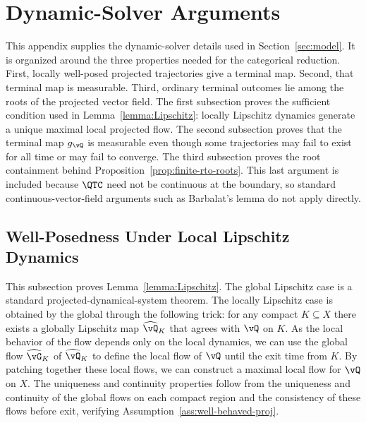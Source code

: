 \section{Dynamic-Solver Arguments}

This appendix supplies the dynamic-solver details used in
Section~\ref{sec:model}. It is organized around the three properties needed for
the categorical reduction. First, locally well-posed projected trajectories give
a terminal map. Second, that terminal map is measurable. Third, ordinary
terminal outcomes lie among the roots of the projected vector field.
The first subsection proves the sufficient condition used in
Lemma~\ref{lemma:Lipschitz}: locally Lipschitz dynamics generate a unique
maximal local projected flow. The second subsection proves that the terminal
map $g_{\vQ}$ is measurable even though some trajectories may fail to exist for
all time or may fail to converge. The third subsection proves the root
containment behind Proposition~\ref{prop:finite-rto-roots}. This last argument
is included because $\QTC$ need not be continuous at the boundary, so standard
continuous-vector-field arguments such as Barbalat's lemma do not apply
directly.

\subsection{Well-Posedness Under Local Lipschitz Dynamics}\label{proof:lipschitz-local-flow}

This subsection proves Lemma~\ref{lemma:Lipschitz}. The global Lipschitz case
is a standard projected-dynamical-system theorem. The locally Lipschitz case
is obtained by the global through the following trick: for any compact
$K\subseteq X$ there exists a globally Lipschitz map $\widehat{\vQ}_K$ that
agrees with $\vQ$ on $K$. As the local behavior of the flow depends only on the
local dynamics, we can use the global flow $\widehat{\vG}_K$ of
$\widehat{\vQ}_K$ to define the local flow of $\vQ$ until the exit time from
$K$. By patching together these local flows, we can construct a maximal local
flow for $\vQ$ on $X$. The uniqueness and continuity properties follow from the
uniqueness and continuity of the global flows on each compact region and the
consistency of these flows before exit, verifying
Assumption~\ref{ass:well-behaved-proj}.


